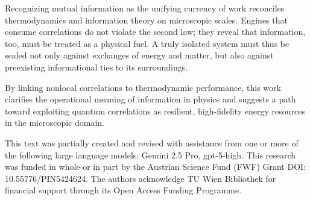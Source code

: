 \documentclass[%
  reprint,
  showpacs,
  showkeys,
  pra,
  longbibliography,
  floatfix,
  x11names
]{revtex4-2}
\begin{document}
Recognizing mutual information as the unifying currency of work reconciles thermodynamics and information theory on microscopic scales. Engines that consume correlations do not violate the second law; they reveal that information, too, must be treated as a physical fuel. A truly isolated system must thus be sealed not only against exchanges of energy and matter, but also against preexisting informational ties to its surroundings.

By linking nonlocal correlations to thermodynamic performance, this work clarifies the operational meaning of information in physics and suggests a path toward exploiting quantum correlations as resilient, high-fidelity energy resources in the microscopic domain.

\begin{acknowledgments}
This text was partially created and revised with assistance from one or more of the following large language models: Gemini 2.5 Pro, gpt-5-high.
This research was funded in whole or in part by the  Austrian Science Fund (FWF) Grant DOI: 10.55776/PIN5424624.
The authors acknowledge TU Wien Bibliothek for financial support through its Open Access Funding Programme.
\end{acknowledgments}



\end{document}
